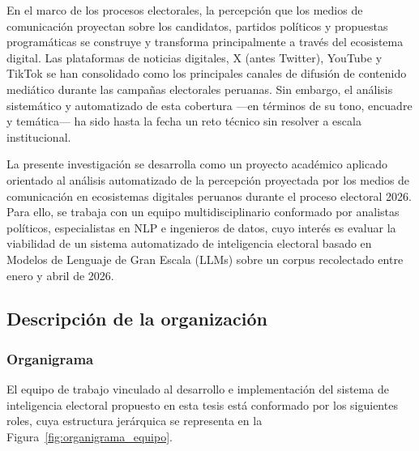 En el marco de los procesos electorales, la percepción que los medios de comunicación proyectan sobre los candidatos, partidos políticos y propuestas programáticas se construye y transforma principalmente a través del ecosistema digital. Las plataformas de noticias digitales, X (antes Twitter), YouTube y TikTok se han consolidado como los principales canales de difusión de contenido mediático durante las campañas electorales peruanas. Sin embargo, el análisis sistemático y automatizado de esta cobertura —en términos de su tono, encuadre y temática— ha sido hasta la fecha un reto técnico sin resolver a escala institucional.

La presente investigación se desarrolla como un proyecto académico aplicado orientado al análisis automatizado de la percepción proyectada por los medios de comunicación en ecosistemas digitales peruanos durante el proceso electoral 2026. Para ello, se trabaja con un equipo multidisciplinario conformado por analistas políticos, especialistas en NLP e ingenieros de datos, cuyo interés es evaluar la viabilidad de un sistema automatizado de inteligencia electoral basado en Modelos de Lenguaje de Gran Escala (LLMs) sobre un corpus recolectado entre enero y abril de 2026.

\subsection{Descripción de la organización}

\subsubsection{Organigrama}

El equipo de trabajo vinculado al desarrollo e implementación del sistema de inteligencia electoral propuesto en esta tesis está conformado por los siguientes roles, cuya estructura jerárquica se representa en la Figura~\ref{fig:organigrama_equipo}.

